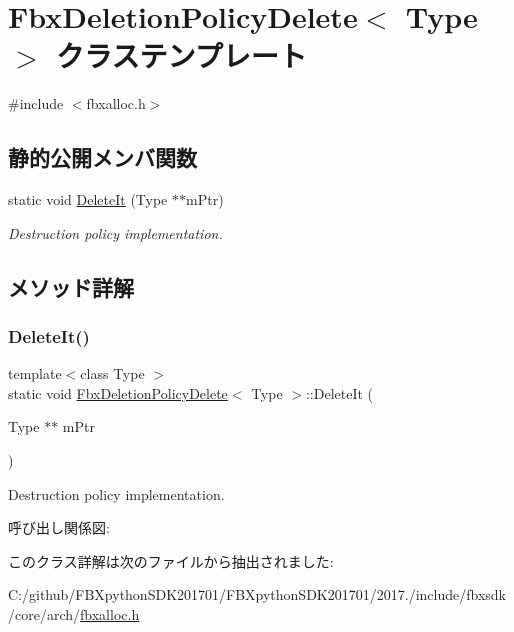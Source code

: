 \hypertarget{class_fbx_deletion_policy_delete}{}\section{Fbx\+Deletion\+Policy\+Delete$<$ Type $>$ クラステンプレート}
\label{class_fbx_deletion_policy_delete}


{\ttfamily \#include $<$fbxalloc.\+h$>$}

\subsection*{静的公開メンバ関数}
\begin{DoxyCompactItemize}
\item 
static void \hyperlink{class_fbx_deletion_policy_delete_ae09420cded9deb38e063f37a1f7d7d11}{Delete\+It} (Type $\ast$$\ast$m\+Ptr)
\begin{DoxyCompactList}\small\item\em Destruction policy implementation. \end{DoxyCompactList}\end{DoxyCompactItemize}


\subsection{メソッド詳解}
\mbox{\label{class_fbx_deletion_policy_delete_ae09420cded9deb38e063f37a1f7d7d11}} 
\subsubsection{\texorpdfstring{Delete\+It()}{DeleteIt()}}
{\footnotesize\ttfamily template$<$class Type $>$ \\
static void \hyperlink{class_fbx_deletion_policy_delete}{Fbx\+Deletion\+Policy\+Delete}$<$ Type $>$\+::Delete\+It (\begin{DoxyParamCaption}\item[{Type $\ast$$\ast$}]{m\+Ptr }\end{DoxyParamCaption})\hspace{0.3cm}{\ttfamily [static]}}



Destruction policy implementation. 

呼び出し関係図\+:


このクラス詳解は次のファイルから抽出されました\+:\begin{DoxyCompactItemize}
\item 
C\+:/github/\+F\+B\+Xpython\+S\+D\+K201701/\+F\+B\+Xpython\+S\+D\+K201701/2017./include/fbxsdk/core/arch/\hyperlink{fbxalloc_8h}{fbxalloc.\+h}\end{DoxyCompactItemize}
